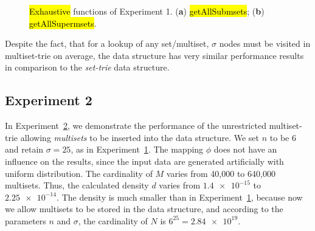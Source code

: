 \documentclass[algorithms,article,accept,pdftex,moreauthors]{Definitions/mdpi}
\begin{document}
\begin{figure}[H]

\caption{\hl{Exhaustive} %
 functions of Experiment 1. (\textbf{a}) \hl{getAllSubmsets}; (\textbf{b}) \hl{getAllSupermsets}.\label{fig:5}}
\end{figure}


Despite the fact, that for a lookup of any set/multiset, $\sigma$ nodes must be visited 
in multiset-trie on average, the data structure has very similar performance 
results in comparison to the \emph{set-trie} data structure.

\subsection{Experiment 2} \label{s:exp2}
In Experiment~\hyperref[s:exp2]{2}, we demonstrate the performance of 
the unrestricted multiset-trie allowing \emph{multisets} to be inserted into the data structure. 
We set $n$ to be 6 and retain $\sigma = 25$, as in Experiment~\hyperref[s:exp1]{1}. 
The mapping $\phi$ does not have an influence on the results, since the input 
data are generated artificially with uniform distribution. The cardinality of $M$ 
varies from 40,000 to 640,000 multisets. Thus, the calculated density $d$ varies 
from $\num{1.4e-15}$ to $\num{2.25e-14}.$ The density is much smaller than 
in Experiment~\hyperref[s:exp1]{1}, because now we allow multisets to be stored 
in the data structure, and according to the parameters $n$ and $\sigma$, the 
cardinality of $N$ is $6^{25} = \num{2.84e19}.$
\end{document}
